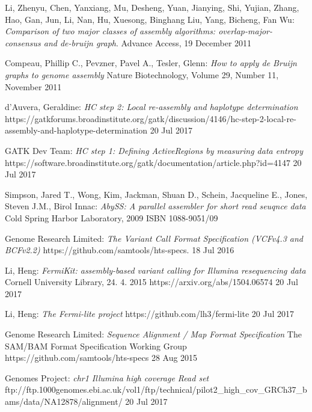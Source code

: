 \begin{thebibliography}{99}

{\sc Li, } Zhenyu, {\sc Chen,} Yanxiang, {\sc Mu,} Desheng, {\sc Yuan,} Jianying, {\sc Shi,} Yujian, {\sc Zhang,} Hao, {\sc Gan,} Jun, {\sc Li,} Nan, {\sc Hu,} Xuesong, {\sc Binghang Liu,} Yang, {\sc Bicheng,} Fan Wu:
\emph{Comparison of two major classes of assembly algorithms: overlap-major-consensus and de-bruijn graph}.
Advance Access, 19 December 2011

{\sc Compeau,} Phillip C., {\sc Pevzner,} Pavel A., {\sc Tesler,} Glenn:
\emph{How to apply de Bruijn graphs to genome assembly}
Nature Biotechnology, Volume 29, Number 11, November 2011

{\sc d'Auvera,} Geraldine: 
\emph{HC step 2: Local re-assembly and haplotype determination}
https://gatkforums.broadinstitute.org/gatk/discussion/4146/hc-step-2-local-re-assembly-and-haplotype-determination
20 Jul 2017

{\sc GATK Dev Team}: 
\emph{HC step 1: Defining ActiveRegions by measuring data entropy}
https://software.broadinstitute.org/gatk/documentation/article.php?id=4147
20 Jul 2017

{\sc Simpson,} Jared T., {\sc Wong,} Kim, {\sc Jackman,} Shuan D., {\sc Schein,} Jacqueline E., {\sc Jones,} Steven J.M., Birol Innac: 
\emph{AbySS: A parallel assembler for short read seuqnce data}
Cold Spring Harbor Laboratory, 2009
ISBN 1088-9051/09

{\sc Genome Research Limited}: 
\emph{The Variant Call Format Specification (VCFv4.3 and BCFv2.2)}
https://github.com/samtools/hts-specs.
18 Jul 2016

{\sc Li,} Heng: 
\emph{FermiKit: assembly-based variant calling for Illumina resequencing data}
Cornell University Library, 24. 4. 2015
https://arxiv.org/abs/1504.06574
20 Jul 2017

{\sc Li,} Heng: 
\emph{The Fermi-lite project}
https://github.com/lh3/fermi-lite
20 Jul 2017

{\sc Genome Research Limited}: 
\emph{Sequence Alignment / Map Format Specification}
The SAM/BAM Format Specification Working Group
https://github.com/samtools/hts-specs
28 Aug 2015

{ Genomes Project}:
\emph{chr1 Illumina high coverage Read set}
ftp://ftp.1000genomes.ebi.ac.uk/vol1/ftp/technical/pilot2\_high\_cov\_GRCh37\_bams/data/NA12878/alignment/
20 Jul 2017


\end{thebibliography}
